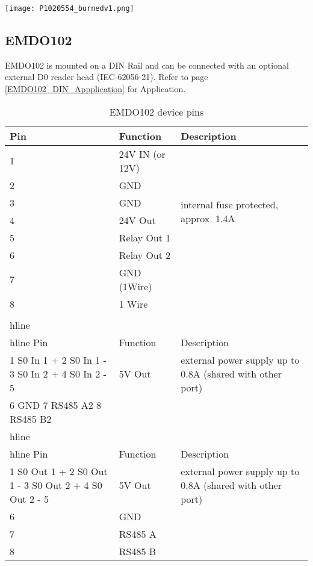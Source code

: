 \documentclass[11pt,fleqn]{book} %
\numberwithin{equation}{section} %
\numberwithin{figure}{section} %
\numberwithin{table}{section} %
\begin{document}
\begin{center}
\texttt{[image: P1020554\_burnedv1.png]}
\end{center}

\begin{comment}
Features now covered in the introduction section
One RS485
one relay output driver
one s0 optical input 
two s0 electrical inputs
two s0 electrical outputs
board temperature sensor
Ethernet 
usb for firmware update
USB Power supply
default reset button
\end{comment}

\newpage
\subsection{EMDO102}
EMDO102 is mounted on a DIN Rail and can be connected with an optional external D0 reader head (IEC-62056-21). Refer to page \ref{EMDO102_DIN_Appplication} for Application.


\begin{table}[h!]
\caption{EMDO102 device pins}
\label{tbl:EMDO102_pins}
\begin{tabular}{@{}l l l @{}}\\\hline
Pin & 	Function 		& Description		\\\hline
1 	&	24V IN (or 12V)	& \multirow{2}{10cm}{}	\\
2 	&	GND				& 					\\\hline
3 	&	GND				& \multirow{2}{10cm}{internal fuse protected, approx. 1.4A}					\\
4 	&	24V Out			& \\\hline
5 	&	Relay Out 1		& \multirow{2}{10cm}{}					\\	
6 	&	Relay Out 2		& 					\\\hline
7 	&	GND (1Wire)		& \multirow{2}{10cm}{}					\\
8 	&	1 Wire			& 					\\\hline
\\hline\\hline
Pin & 	Function 		& Description		\\\hline
1 S0 In 1 +
2 S0 In 1 -
3 S0 In 2 +
4 S0 In 2 -
5 	&	5V Out		 	& external power supply up to 0.8A (shared with other port)	\\\hline
6 GND
7 RS485 A2
8 RS485 B2
\\hline\\hline
Pin & 	Function 		& Description		\\\hline
1 S0 Out 1 +
2 S0 Out 1 -
3 S0 Out 2 +
4 S0 Out 2 -
5 	&	5V Out		 	& external power supply up to 0.8A (shared with other port)	\\\hline
6 	&	GND				& \multirow{2}{10cm}{}					\\
7 	&	RS485 A			& \multirow{2}{10cm}{}					\\
8 	&	RS485 B			&					\\\hline
\end{tabular}
\end{table}
\end{document}
